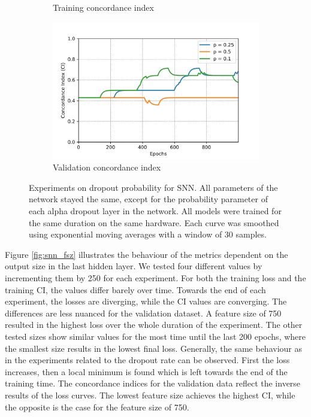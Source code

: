 \begin{figure}[h!t]
\begin{subfigure}[b]{0.49\textwidth}
         \caption{Training concordance index}
     \end{subfigure}
    \hfill
     \begin{subfigure}[b]{0.49\textwidth}
         \centering
         \includegraphics[width=\textwidth]{latex/ci_plots/snn_dropout_val_ci.png}
         \caption{Validation concordance index}
     \end{subfigure}
    \hfill
    \caption[Experiments on dropout probability for SNN]{Experiments on dropout probability for SNN. All parameters of the network stayed the same, except for the probability parameter of each alpha dropout layer in the network. All models were trained for the same duration on the same hardware. Each curve was smoothed using exponential moving averages with a window of 30 samples.}
    \label{fig:snn_dropout}
\end{figure}

Figure \ref{fig:snn_fsz} illustrates the behaviour of the metrics dependent on the output size in the last hidden layer. We tested four different values by incrementing them by 250 for each experiment. For both the training loss and the training CI, the values differ barely over time. Towards the end of each experiment, the losses are diverging, while the CI values are converging. The differences are less nuanced for the validation dataset. A feature size of 750 resulted in the highest loss over the whole duration of the experiment. The other tested sizes show similar values for the most time until the last 200 epochs, where the smallest size results in the lowest final loss. Generally, the same behaviour as in the experiments related to the dropout rate can be observed. First the loss increases, then a local minimum is found which is left towards the end of the training time. 
The concordance indices for the validation data reflect the inverse results of the loss curves. The lowest feature size achieves the highest CI, while the opposite is the case for the feature size of 750.

